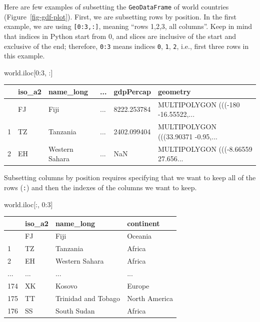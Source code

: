\documentclass[
  letterpaper,
]{krantz}
\newenvironment{Shaded}{\begin{snugshade}}{\end{snugshade}}
\newcommand{\DecValTok}[1]{\textcolor[rgb]{0.68,0.00,0.00}{#1}}
\newcommand{\NormalTok}[1]{\textcolor[rgb]{0.00,0.23,0.31}{#1}}
\begin{document}
Here are few examples of subsetting the \texttt{GeoDataFrame} of world
countries (Figure~\ref{fig-gdf-plot}). First, we are subsetting rows by
position. In the first example, we are using \texttt{{[}0:3,:{]}},
meaning ``rows 1,2,3, all columns''. Keep in mind that indices in Python
start from 0, and slices are inclusive of the start and exclusive of the
end; therefore, \texttt{0:3} means indices \texttt{0}, \texttt{1},
\texttt{2}, i.e., first three rows in this example.

\begin{Shaded}
\begin{Highlighting}[]
\NormalTok{world.iloc[}\DecValTok{0}\NormalTok{:}\DecValTok{3}\NormalTok{, :]}
\end{Highlighting}
\end{Shaded}

\begin{longtable}[]{@{}llllll@{}}
\toprule\noalign{}
& iso\_a2 & name\_long & ... & gdpPercap & geometry \\
\midrule\noalign{}
\endhead
\bottomrule\noalign{}
\endlastfoot
0 & FJ & Fiji & ... & 8222.253784 & MULTIPOLYGON (((-180
-16.55522,... \\
1 & TZ & Tanzania & ... & 2402.099404 & MULTIPOLYGON (((33.90371
-0.95,... \\
2 & EH & Western Sahara & ... & NaN & MULTIPOLYGON (((-8.66559
27.656... \\
\end{longtable}

Subsetting columns by position requires specifying that we want to keep
all of the rows (\texttt{:}) and then the indexes of the columns we want
to keep.

\begin{Shaded}
\begin{Highlighting}[]
\NormalTok{world.iloc[:, }\DecValTok{0}\NormalTok{:}\DecValTok{3}\NormalTok{]}
\end{Highlighting}
\end{Shaded}

\begin{longtable}[]{@{}llll@{}}
\toprule\noalign{}
& iso\_a2 & name\_long & continent \\
\midrule\noalign{}
\endhead
\bottomrule\noalign{}
\endlastfoot
0 & FJ & Fiji & Oceania \\
1 & TZ & Tanzania & Africa \\
2 & EH & Western Sahara & Africa \\
... & ... & ... & ... \\
174 & XK & Kosovo & Europe \\
175 & TT & Trinidad and Tobago & North America \\
176 & SS & South Sudan & Africa \\
\end{longtable}
\end{document}

